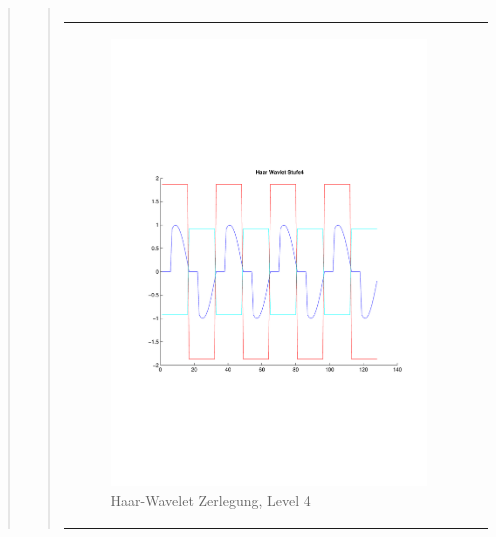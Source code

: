 \begin{quote}
\begin{quote}
\begin{center}
\begin{tabular}{ll}
                \end{tabular}
                \end{center}
    
                
                
        \begin{center}
                \begin{tabular}{ll}
    
                \hspace{-12em}
                    \begin{minipage}{0.6\textwidth}
    
                        \begin{figure}[H]
                            \label{fig:}
                            \includegraphics[scale=0.45, trim = 0.8cm 6cm 3cm
                            7.5cm,
                            clip]{./Bilder/Termin8/Haar_Wavlet_lvl_4}
                            \caption{Haar-Wavelet Zerlegung, Level 4}
                        \end{figure}
    

\end{minipage}
\end{tabular}
\end{center}
\end{quote}
\end{quote}
